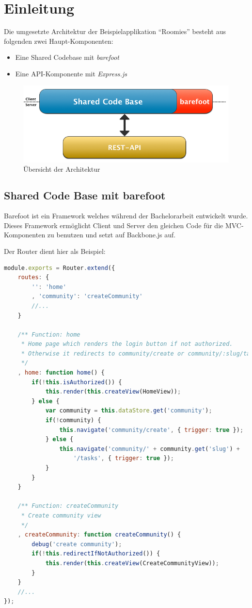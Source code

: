 \section*{Einleitung}

Die umgesetzte Architektur der Beispielapplikation ``Roomies'' besteht aus folgenden zwei Haupt-Komponenten:
\begin{itemize}
	\item Eine Shared Codebase mit \emph{barefoot} \cite{Barefoot}
	\item Eine API-Komponente mit \emph{Express.js} \cite{Expressjs}
\end{itemize}

\begin{figure}[ht]
	\includegraphics[width=\textwidth]{content/images/grob-layers-sad.png}
	\caption{Übersicht der Architektur}
\end{figure}

\subsection*{Shared Code Base mit barefoot}
Barefoot \cite{Barefoot} ist ein Framework welches während der Bachelorarbeit entwickelt wurde.
Dieses Framework ermöglicht Client und Server den gleichen Code für die MVC-Komponenten zu benutzen und setzt auf
Backbone.js \cite{Backbonejs} auf.

Der Router dient hier als Beispiel:
\begin{lstlisting}[language=JavaScript, caption=Auszug aus Router der Beispielapplikation \cite{roomiesRouter}, label=lst:roomiesRouter, firstnumber=25]
module.exports = Router.extend({
	routes: {
		'': 'home'
		, 'community': 'createCommunity'
		//...
	}

	/** Function: home
	 * Home page which renders the login button if not authorized.
	 * Otherwise it redirects to community/create or community/:slug/tasks.
	 */
	, home: function home() {
		if(!this.isAuthorized()) {
			this.render(this.createView(HomeView));
		} else {
			var community = this.dataStore.get('community');
			if(!community) {
				this.navigate('community/create', { trigger: true });
			} else {
				this.navigate('community/' + community.get('slug') +
					'/tasks', { trigger: true });
			}
		}
	}

	/** Function: createCommunity
	 * Create community view
	 */
	, createCommunity: function createCommunity() {
		debug('create community');
		if(!this.redirectIfNotAuthorized()) {
			this.render(this.createView(CreateCommunityView));
		}
	}
	//...
});
\end{lstlisting}

